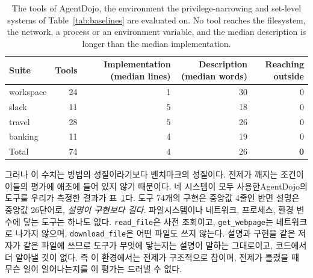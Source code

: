 \documentclass[acmsmall,screen,review,anonymous]{acmart}
\begin{document}
\begin{table}[h]
\caption{The tools of AgentDojo, the environment the privilege-narrowing and set-level systems of Table~\ref{tab:baselines} are evaluated on. No tool reaches the filesystem, the network, a process or an environment variable, and the median description is longer than the median implementation.}
\label{tab:adtools}
\small
\begin{tabular}{lrrrr}
\toprule
Suite & Tools & Implementation (median lines) & Description (median words) & Reaching outside \\
\midrule
workspace & 24 & 1 & 30 & 0 \\
slack     & 11 & 5 & 18 & 0 \\
travel    & 28 & 5 & 26 & 0 \\
banking   & 11 & 4 & 19 & 0 \\
\midrule
Total     & 74 & 4 & 26 & \textbf{0} \\
\bottomrule
\end{tabular}
\end{table}

그러나 이 수치는 방법의 성질이라기보다 벤치마크의 성질이다. 전제가 깨지는 조건이 이들의 평가에 애초에 들어 있지 않기 때문이다. 네 시스템이 모두 사용한AgentDojo의 도구를 우리가 측정한 결과가 표~\ref{tab:adtools}다. 도구 74개의 구현은 중앙값 4줄인 반면 설명은 중앙값 26단어로, \emph{설명이 구현보다 길다}. 파일시스템이나 네트워크, 프로세스, 환경 변수에 닿는 도구는 하나도 없다. \texttt{read\_file}은 사전 조회이고, \texttt{get\_webpage}는 네트워크로 나가지 않으며, \texttt{download\_file}은 어떤 파일도 쓰지 않는다. 설명과 구현을 같은 저자가 같은 파일에 쓰므로 도구가 무엇에 닿는지는 설명이 말하는 그대로이고, 코드에서 더 알아낼 것이 없다. 즉 이 환경에서는 전제가 구조적으로 참이며, 전제가 틀렸을 때 무슨 일이 일어나는지를 이 평가는 드러낼 수 없다.
\end{document}
